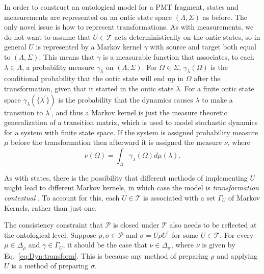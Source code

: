 \documentclass[DIV=calc,fontsize=12pt]{scrartcl} %
\theoremstyle{definition}
\theoremstyle{plain}
\begin{document}
In order to construct an ontological model for a PMT fragment, states
and measurements are represented on an ontic state space $(\Lambda,
\Sigma)$ as before.  The only novel issue is how to represent
transformations.  As with measurements, we do not want to assume that
$U \in \mathcal{T}$ acts deterministically on the ontic states, so in
general $U$ is represented by a Markov kernel $\gamma$ with source and
target both equal to $(\Lambda,\Sigma)$.  This means that $\gamma$ is
a measurable function that associates, to each $\lambda \in \Lambda$,
a probability measure $\gamma_{\lambda}$ on $(\Lambda,\Sigma)$.  For
$\Omega \in \Sigma$, $\gamma_{\lambda}(\Omega)$ is the conditional
probability that the ontic state will end up in $\Omega$ after the
transformation, given that it started in the ontic state $\lambda$.
For a finite ontic state space
$\gamma_{\lambda}(\{\lambda^{\prime}\})$ is the probability that the
dynamics causes $\lambda$ to make a transition to $\lambda^{\prime}$,
and thus a Markov kernel is just the measure theoretic generalization
of a transition matrix, which is used to model stochastic dynamics for
a system with finite state space.  If the system is assigned
probability measure $\mu$ before the transformation then afterward it
is assigned the measure $\nu$, where
\begin{equation}
\label{eq:Dyn:transform}
\nu(\Omega) = \int_{\Lambda} \gamma_{\lambda}(\Omega) d\mu(\lambda).
\end{equation}

As with states, there is the possibility that different methods of
implementing $U$ might lead to different Markov kernels, in which case
the model is \emph{transformation contextual} \cite{Spekkens2005}.  To
account for this, each $U \in \mathcal{T}$ is associated with a set
$\Gamma_{U}$ of Markov Kernels, rather than just one.

The consistency constraint that $\mathcal{P}$ is closed under
$\mathcal{T}$ also needs to be reflected at the ontological level.
Suppose $\rho, \sigma \in \mathcal{P}$ and $\sigma = U \rho
U^{\dagger}$ for some $U \in \mathcal{T}$.  For every $\mu \in
\Delta_{\rho}$ and $\gamma \in \Gamma_U$, it should be the case that
$\nu \in \Delta_{\sigma}$, where $\nu$ is given by
Eq.~\eqref{eq:Dyn:transform}.  This is because any method of preparing
$\rho$ and applying $U$ is a method of preparing $\sigma$.
\end{document}
